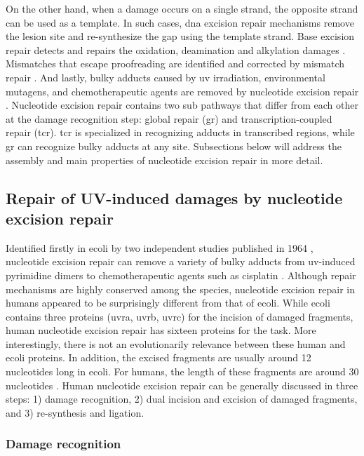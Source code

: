 On the other hand, when a damage occurs on a single strand, the opposite strand can be used as a template. In such cases, \gls{dna} excision repair mechanisms remove the lesion site and re-synthesize the gap using the template strand. Base excision repair detects and repairs the oxidation, deamination and alkylation damages \citep{klungland1999base}. Mismatches that escape proofreading are identified and corrected by mismatch repair \citep{modrich1997strand}. And lastly, bulky adducts caused by \gls{uv} irradiation, environmental mutagens, and chemotherapeutic agents are removed by nucleotide excision repair \citep{reardon2005nucleotide}. Nucleotide excision repair contains two sub pathways that differ from each other at the damage recognition step: global repair (\gls{gr}) and transcription-coupled repair (\gls{tcr}). \gls{tcr} is specialized in recognizing adducts in transcribed regions, while \gls{gr} can recognize bulky adducts at any site. Subsections below will address the assembly and main properties of nucleotide excision repair in more detail.  

\subsection{Repair of UV-induced damages by nucleotide excision repair}

Identified firstly in \gls{ecoli} by two independent studies published in 1964 \citep{boyce1964release,setlow1964disappearance}, nucleotide excision repair can remove a variety of bulky adducts from \gls{uv}-induced pyrimidine dimers to chemotherapeutic agents such as cisplatin \citep{yimit2019differential}. Although repair mechanisms are highly conserved among the species, nucleotide excision repair in humans appeared to be surprisingly different from that of \gls{ecoli}. While \gls{ecoli} contains three proteins (\gls{uvra}, \gls{uvrb}, \gls{uvrc}) for the incision of damaged fragments, human nucleotide excision repair has sixteen proteins for the task. More interestingly, there is not an evolutionarily relevance between these human and \gls{ecoli} proteins. In addition, the excised fragments are usually around 12 nucleotides long in \gls{ecoli}. For humans, the length of these fragments are around 30 nucleotides \citep{sancar2016mechanisms}. Human nucleotide excision repair can be generally discussed in three steps: 1) damage recognition, 2) dual incision and excision of damaged fragments, and 3) re-synthesis and ligation.  

\subsubsection{Damage recognition}

